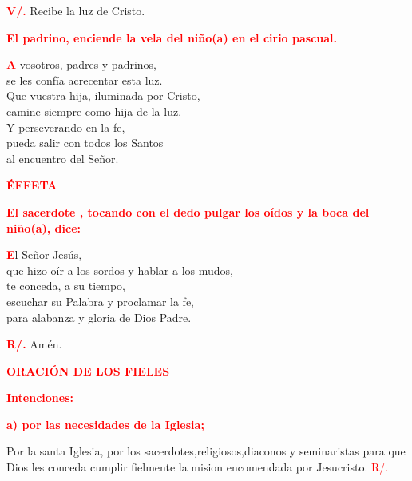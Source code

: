 \documentclass[12pt, letterpaper]{report}
\begin{document}
\noindent
\Large {\bfseries \textcolor{red}{V/.}} \hspace{0.5cm} Recibe la luz de Cristo. \newline

\large {\bfseries \textcolor{red}{El padrino, enciende la vela del ni\~no(a) en el cirio pascual.}}

\lettrine[lines=1]{\bfseries \textcolor{red}{A}}{} \Large vosotros, padres y padrinos, \\
se les conf\'ia acrecentar esta luz.\\
Que vuestra hija, iluminada por Cristo, \\
camine siempre como hija de la luz. \\
Y perseverando en la fe, \\
pueda salir con todos los Santos \\
al encuentro del Se\~nor. \newline

\newpage

\Large {\bfseries \textcolor{red}{ \'EFFETA}} \newline

\large {\bfseries \textcolor{red}{El sacerdote , tocando con el dedo pulgar los o\'idos y la boca del ni\~no(a), dice:}}

\lettrine[lines=1]{\bfseries \textcolor{red}{E}}{}\Large l Se\~nor Jes\'us, \\
que hizo o\'ir a los sordos y hablar a los mudos, \\
te conceda, a su tiempo, \\
escuchar su Palabra y proclamar la fe, \\
para alabanza y gloria de Dios Padre. \newline

\noindent
\Large {\bfseries \textcolor{red}{R/.}} \hspace{0.5cm} Am\'en. \newline

\newpage

\Large {\bfseries \textcolor{red}{ORACI\'ON DE LOS FIELES}} \newline

\large {\bfseries \textcolor{red}{Intenciones:}} \newline

\large {\bfseries \textcolor{red}{a) por las necesidades de la Iglesia;}} \newline

\Large Por la santa Iglesia, por los sacerdotes,religiosos,diaconos y seminaristas para que Dios les conceda cumplir fielmente la mision encomendada por Jesucristo. \hspace{1cm} \textcolor{red}{R/.}\newline
\end{document}
